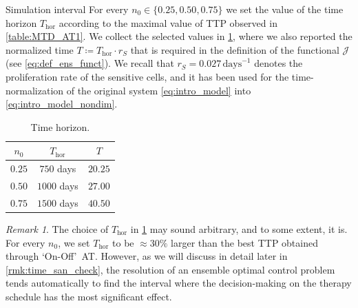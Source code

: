 \documentclass[a4paper,12pt, reqno]{amsart}
\theoremstyle{plain}
\theoremstyle{definition}
\theoremstyle{remark}
\newtheorem{remark}{Remark}
\numberwithin{equation}{section}
\newcommand{\J}{\mathcal{J}}
\begin{document}
\begin{paragraph}{{Simulation} interval}
    For every $n_0\in\{0.25,0.50,0.75\}$ we set the value of the time horizon $T_{\mathrm{hor}}$ according to the maximal value of TTP observed in \cref{table:MTD_AT1}. 
    We collect the selected values in \cref{table:Time_horizon}, where we also reported the normalized time $T\coloneqq T_{\mathrm{hor}} \cdot r_S$ that is required in the definition of the functional $\J$ (see \cref{eq:def_ens_funct}). 
    We recall that $r_S=0.027 \,\mathrm{days}^{-1}$ denotes the proliferation rate of the sensitive cells, and it has been used for the time-normalization of the original system \eqref{eq:intro_model} into \eqref{eq:intro_model_nondim}.  
    
\begin{table}[h]
\caption{Time horizon.}
\label{table:Time_horizon}

\centering
\begin{tabular}{c c c}
\toprule
$n_0$ & $T_{\mathrm{hor}}$ & $T$ \\
\midrule
$0.25$ & $750$ days & $20.25$ \\
$0.50$ & $1000$ days & $27.00$ \\
$0.75$ & $1500$ days & $40.50$ \\
\bottomrule
\end{tabular}

\vspace{5pt}
\end{table}

\begin{remark} \label{rmk:choice_T}
    The choice of $T_{\mathrm{hor}}$ in \cref{table:Time_horizon} may sound arbitrary, and to some extent, it is. For every $n_0$, we set $T_{\mathrm{hor}}$ to be $\approx 30\%$ larger than the best TTP obtained through `On-Off'~AT.
    However, as we will discuss in detail later in \cref{rmk:time_san_check}, the resolution of an ensemble optimal control problem tends automatically to find the interval where the decision-making on the therapy schedule has the most significant effect.
\end{remark}
\end{paragraph}

\vspace{6pt}
\end{document}
